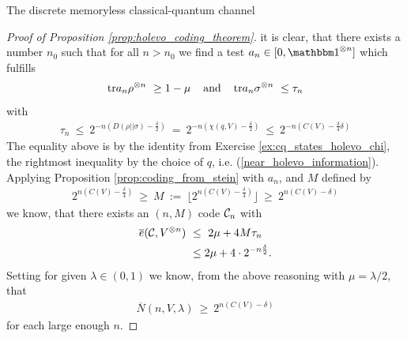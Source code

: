 \begin{section}{The discrete memoryless  classical-quantum channel}
\begin{proof}[Proof of Proposition \ref{prop:holevo_coding_theorem}]
   		it is clear, that there exists a number $n_0$ such that for all $n > n_0$ we find a test $a_n \in [0,\bbmeins^{\otimes n}]$ which fulfills 
   		\begin{align}
   		 \mathrm{tr} a_n \rho^{\otimes n} \ \geq 1 - \mu \hspace{.4cm} 
   		 \text{and} \hspace{.4cm}
   		 \mathrm{tr} a_n \sigma^{\otimes n} \ \leq \tau_n
   		\end{align}
		with 
		\begin{align}
		 \tau_n \ \leq \ 2^{-n(D(\rho||\sigma) - \frac{\delta}{2})} \ = \ 2^{-n(\chi(q,V) -  \frac{\delta}{2})} \ \leq \ 2^{-n (C(V) - \frac{3}{4}\delta)}
		\end{align}
		The equality above is by the identity from Exercise \ref{ex:cq_states_holevo_chi}, the rightmost inequality by the choice of $q$, i.e. (\ref{near_holevo_information}). Applying Proposition \ref{prop:coding_from_stein} with $a_n$, and $M$ defined by
		\begin{align*}
		2^{n(C(V) - \frac{\delta}{4})} \ \geq \ M \ := \ \lfloor 2^{n(C(V)- \frac{\delta}{4})} \rfloor \ \geq \ 2^{n(C(V)- \delta)}
		\end{align*}
		we know, that there exists an $(n,M)$ code ${\mathcal C}_n$ with 
		\begin{align*}
			\overline{e}(\cC, V^{\otimes n}) \ 
			&\leq \ 2 \mu + 4 M \tau_n  \nonumber \\ 
			&\leq 2 \mu + 4 \cdot 2^{-n \frac{\delta}{2}}.
		\end{align*}
		Setting for given $\lambda \in (0,1)$ we know, from the above reasoning with $\mu = \lambda/2$, that 
		\begin{align*}
		 \overline{N}(n,V,\lambda) \ \geq \ 2^{n(C(V)-\delta)} 
		\end{align*}
		for each large enough $n$. 
   		\end{proof}	
   	\end{section}
     
